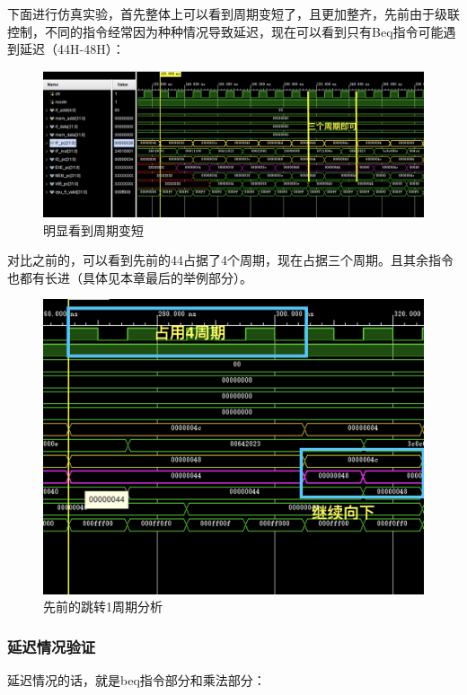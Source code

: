 \documentclass[a4paper]{article}
\begin{document}
下面进行仿真实验，首先整体上可以看到周期变短了，且更加整齐，先前由于级联控制，不同的指令经常因为种种情况导致延迟，现在可以看到只有Beq指令可能遇到延迟（44H-48H）：
\begin{figure}[H]
    \centering
    \includegraphics[width=0.9\linewidth]{img/旁路修改图片/明显看到周期变短.png}
    \caption{明显看到周期变短}
\end{figure}

对比之前的，可以看到先前的44占据了4个周期，现在占据三个周期。且其余指令也都有长进（具体见本章最后的举例部分）。

\begin{figure}[H]
    \centering
    \includegraphics[width=0.9\linewidth]{img/顺序图片/跳转1周期分析.png}
    \caption{先前的跳转1周期分析}
\end{figure}


\subsubsection{延迟情况验证}

延迟情况的话，就是beq指令部分和乘法部分：
\end{document}
